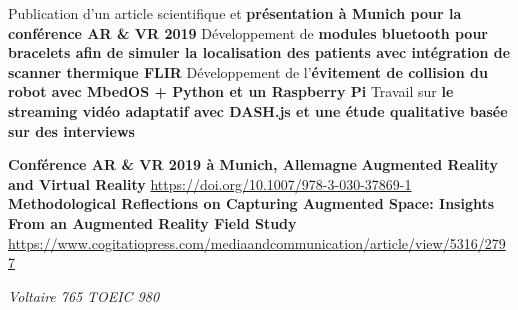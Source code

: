 \documentclass[10.5pt,a4paper,ragged2e,withhyper]{altacv}
\begin{document}
\begin{paracol}{2}

Publication d'un article scientifique et \textbf{présentation à Munich pour la conférence AR \& VR 2019}
\smallbreak
\divider
{}
Développement de \textbf{modules bluetooth pour bracelets afin de simuler la localisation des patients avec intégration de scanner thermique FLIR}
\smallbreak
\divider
{}
Développement de l'\textbf{évitement de collision du robot avec MbedOS + Python et un Raspberry Pi}
\smallbreak
\divider
{}
Travail sur \textbf{le streaming vidéo adaptatif avec DASH.js et une étude qualitative basée sur des interviews}

\medskip
{}
\smallbreak
\textbf{Conférence AR \& VR 2019 à Munich, Allemagne}
\smallbreak
\smallbreak
{}
\smallbreak
\textbf{Augmented Reality and Virtual Reality}
\smallbreak
\url{https://doi.org/10.1007/978-3-030-37869-1}
\smallbreak
\textbf{Methodological Reflections on Capturing Augmented Space: Insights From an Augmented Reality Field Study}
\smallbreak
\url{https://www.cogitatiopress.com/mediaandcommunication/article/view/5316/2797}


\switchcolumn
\newpage

\textit{Voltaire 765}
\smallbreak
{}
\textit{TOEIC 980}
\smallbreak
{}
\smallbreak
{}
\smallbreak
{}


\end{paracol}
\end{document}
